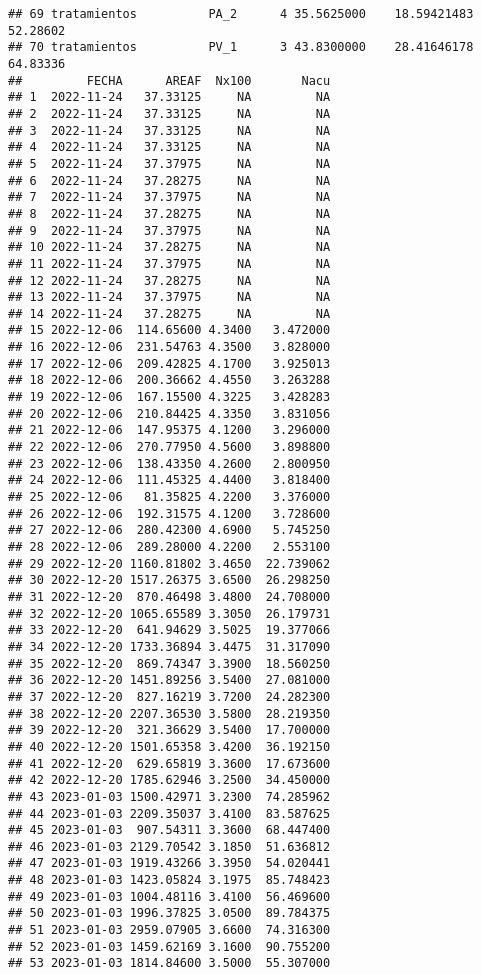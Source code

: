 \documentclass[
]{article}
\begin{document}
\begin{verbatim}
## 69 tratamientos          PA_2      4 35.5625000    18.59421483 52.28602
## 70 tratamientos          PV_1      3 43.8300000    28.41646178 64.83336
##         FECHA      AREAF  Nx100       Nacu
## 1  2022-11-24   37.33125     NA         NA
## 2  2022-11-24   37.33125     NA         NA
## 3  2022-11-24   37.33125     NA         NA
## 4  2022-11-24   37.33125     NA         NA
## 5  2022-11-24   37.37975     NA         NA
## 6  2022-11-24   37.28275     NA         NA
## 7  2022-11-24   37.37975     NA         NA
## 8  2022-11-24   37.28275     NA         NA
## 9  2022-11-24   37.37975     NA         NA
## 10 2022-11-24   37.28275     NA         NA
## 11 2022-11-24   37.37975     NA         NA
## 12 2022-11-24   37.28275     NA         NA
## 13 2022-11-24   37.37975     NA         NA
## 14 2022-11-24   37.28275     NA         NA
## 15 2022-12-06  114.65600 4.3400   3.472000
## 16 2022-12-06  231.54763 4.3500   3.828000
## 17 2022-12-06  209.42825 4.1700   3.925013
## 18 2022-12-06  200.36662 4.4550   3.263288
## 19 2022-12-06  167.15500 4.3225   3.428283
## 20 2022-12-06  210.84425 4.3350   3.831056
## 21 2022-12-06  147.95375 4.1200   3.296000
## 22 2022-12-06  270.77950 4.5600   3.898800
## 23 2022-12-06  138.43350 4.2600   2.800950
## 24 2022-12-06  111.45325 4.4400   3.818400
## 25 2022-12-06   81.35825 4.2200   3.376000
## 26 2022-12-06  192.31575 4.1200   3.728600
## 27 2022-12-06  280.42300 4.6900   5.745250
## 28 2022-12-06  289.28000 4.2200   2.553100
## 29 2022-12-20 1160.81802 3.4650  22.739062
## 30 2022-12-20 1517.26375 3.6500  26.298250
## 31 2022-12-20  870.46498 3.4800  24.708000
## 32 2022-12-20 1065.65589 3.3050  26.179731
## 33 2022-12-20  641.94629 3.5025  19.377066
## 34 2022-12-20 1733.36894 3.4475  31.317090
## 35 2022-12-20  869.74347 3.3900  18.560250
## 36 2022-12-20 1451.89256 3.5400  27.081000
## 37 2022-12-20  827.16219 3.7200  24.282300
## 38 2022-12-20 2207.36530 3.5800  28.219350
## 39 2022-12-20  321.36629 3.5400  17.700000
## 40 2022-12-20 1501.65358 3.4200  36.192150
## 41 2022-12-20  629.65819 3.3600  17.673600
## 42 2022-12-20 1785.62946 3.2500  34.450000
## 43 2023-01-03 1500.42971 3.2300  74.285962
## 44 2023-01-03 2209.35037 3.4100  83.587625
## 45 2023-01-03  907.54311 3.3600  68.447400
## 46 2023-01-03 2129.70542 3.1850  51.636812
## 47 2023-01-03 1919.43266 3.3950  54.020441
## 48 2023-01-03 1423.05824 3.1975  85.748423
## 49 2023-01-03 1004.48116 3.4100  56.469600
## 50 2023-01-03 1996.37825 3.0500  89.784375
## 51 2023-01-03 2959.07905 3.6600  74.316300
## 52 2023-01-03 1459.62169 3.1600  90.755200
## 53 2023-01-03 1814.84600 3.5000  55.307000

\end{verbatim}
\end{document}
